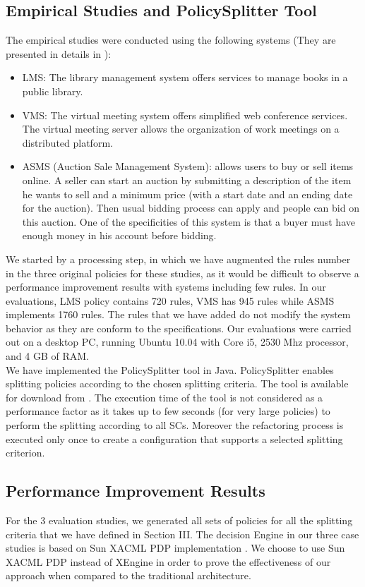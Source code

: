 \subsection{Empirical Studies and PolicySplitter Tool}
The empirical studies were conducted using the following systems (They are presented in details in \cite{testcase}):
\begin{itemize}	
\item LMS: The library management system offers services to manage books in a public library.
\item VMS: The virtual meeting system offers simplified web conference services. The virtual meeting server allows the organization of work meetings on 
a distributed platform.
\item ASMS (Auction Sale Management System): allows users to buy or sell items online. A seller can start an auction by submitting a description of the
item he wants to sell and a minimum price (with a start date and an ending date for the auction). Then usual bidding process can apply and people can bid 
on this auction. One of the specificities of this system is that a buyer must have enough money in his account before bidding.
\end{itemize}
We started by a processing step, in which we have augmented the rules number in the three original policies for these studies, as it would be difficult
 to observe a performance improvement results with systems including few rules. In our evaluations, LMS policy contains 720 rules, VMS has 945 rules while ASMS implements 1760 rules. 
The rules that we have added do not modify the system behavior as they are conform to the specifications. Our evaluations were carried out on a desktop PC, 
running Ubuntu 10.04 with Core i5, 2530 Mhz processor, and 4 GB of RAM. 
\\
We have implemented the PolicySplitter tool in Java. PolicySplitter enables splitting policies according to the chosen splitting criteria. 
The tool is available for download from \cite{splitter}.
The execution time of the tool is not considered as a performance factor as it takes up to few seconds (for very large policies) to perform the splitting 
according to all SCs. Moreover the refactoring process is executed only once to create a configuration that supports a selected splitting criterion.


\subsection{Performance Improvement Results}
For the 3 evaluation studies, we generated all sets of policies for all the splitting criteria that we have defined in Section III.
The decision Engine in our three case studies is based on Sun XACML PDP implementation \cite{sunxacml}. We choose to use Sun XACML PDP instead of XEngine in order to prove the effectiveness
 of our approach when compared to the traditional architecture.



